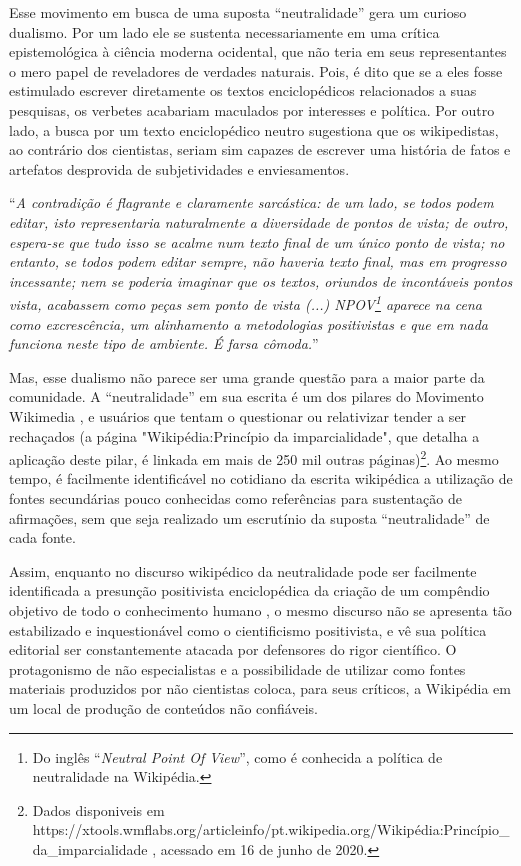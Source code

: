 Esse movimento em busca de uma suposta ``neutralidade'' gera um curioso dualismo. Por um lado ele se sustenta necessariamente em uma crítica epistemológica à ciência moderna ocidental, que não teria em seus representantes o mero papel de reveladores de verdades naturais. Pois, é dito que se a eles fosse estimulado escrever diretamente os textos enciclopédicos relacionados a suas pesquisas, os verbetes acabariam maculados por interesses e política. Por outro lado, a busca por um texto enciclopédico neutro sugestiona que os wikipedistas, ao contrário dos cientistas, seriam sim capazes de escrever uma história de fatos e artefatos desprovida de subjetividades e enviesamentos.

``\textit{A contradição é flagrante e claramente sarcástica: de um lado, se todos podem editar, isto representaria naturalmente a diversidade de pontos de vista; de outro, espera-se que tudo isso se acalme num texto final de um único ponto de vista; no entanto, se todos podem editar sempre, não haveria texto final, mas em progresso incessante; nem se poderia imaginar que os textos, oriundos de incontáveis pontos vista, acabassem como peças sem ponto de vista (...) NPOV\footnote{Do inglês ``\textit{Neutral Point Of View}'', como é conhecida a política de neutralidade na Wikipédia.} aparece na cena como excrescência, um alinhamento a metodologias positivistas e que em nada funciona neste tipo de ambiente. É farsa cômoda.}'' \citep{demo_conhecimento_2009}

Mas, esse dualismo não parece ser uma grande questão para a maior parte da comunidade. A ``neutralidade'' em sua escrita é um dos pilares do Movimento Wikimedia , e usuários que tentam o questionar ou relativizar tender a ser rechaçados (a página "Wikipédia:Princípio da imparcialidade", que detalha a aplicação deste pilar, é linkada em mais de 250 mil outras páginas)\footnote{Dados disponiveis em https://xtools.wmflabs.org/articleinfo/pt.wikipedia.org/Wikipédia:Princípio\_da\_imparcialidade , acessado em 16 de junho de 2020.}. Ao mesmo tempo, é facilmente identificável no cotidiano da escrita wikipédica a utilização de fontes secundárias pouco conhecidas como referências para sustentação de afirmações, sem que seja realizado um escrutínio da suposta ``neutralidade'' de cada fonte. 

Assim, enquanto no discurso wikipédico da neutralidade pode ser facilmente identificada a presunção positivista enciclopédica da criação de um compêndio objetivo de todo o conhecimento humano \citep{esteves_as_2014}, o mesmo discurso não se apresenta tão estabilizado e inquestionável como o cientificismo positivista, e vê sua política editorial ser constantemente atacada por defensores do rigor científico. \citep{taraborelli_expert_2011} O protagonismo de não especialistas e a possibilidade de utilizar como fontes materiais produzidos por não cientistas coloca, para seus críticos, a Wikipédia em um local de produção de conteúdos não confiáveis.

